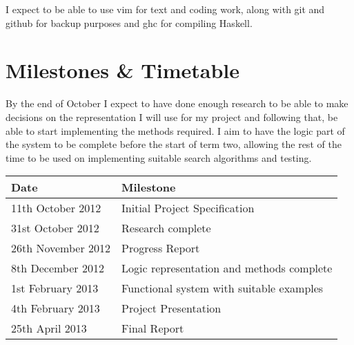 \documentclass{article}
\begin{document}
I expect to be able to use vim for text and coding work, along with git and
github for backup purposes and ghc for compiling Haskell.

\section*{Milestones \& Timetable}

By the end of October I expect to have done enough research to be able
to make decisions on the representation I will use for my project and following
that, be able to start implementing the methods required. I aim to have the
logic part of the system to be complete before the start of term two, allowing
the rest of the time to be used on implementing suitable search algorithms and
testing.

\begin{center}
    \begin{tabular}{|l|l|}
    \hline
    Date & Milestone \\
    \hline
    \rowcolor[gray]{0.9}
    11th October 2012 & Initial Project Specification \\
    31st October 2012 & Research complete \\
    \rowcolor[gray]{0.9}
    26th November 2012 & Progress Report \\
    8th December 2012 & Logic representation and methods complete \\
    1st February 2013 & Functional system with suitable examples \\
    \rowcolor[gray]{0.9}
    4th February 2013 & Project Presentation \\
    \rowcolor[gray]{0.9}
    25th April 2013 & Final Report \\
    \hline
    \end{tabular}
\end{center}



\end{document}
